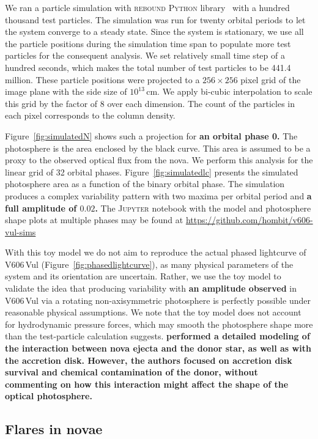 \documentclass[twocolumn]{aastex631}
\newcommand{\nova}{V606\,Vul}
\begin{document}
We ran a particle simulation with \textsc{rebound} \textsc{Python} library~\citep{rein_liu2012} with a hundred thousand test particles.
The simulation was run for twenty orbital periods to let the system converge to a steady state. 
Since the system is stationary, we use all the particle positions during the simulation time span to populate more test particles for the consequent analysis.
We set relatively small time step of a hundred seconds, which makes the total number of test particles to be 441.4 million.
These particle positions were projected to a $256\times256$ pixel grid of the image plane with the side size of $10^{13}$\,cm.
We apply bi-cubic interpolation to scale this grid by the factor of 8 over each dimension.
The count of the particles in each pixel corresponds to the column density.

Figure~\ref{fig:simulatedN} shows such a projection for {\bf an orbital phase 0.} 
The photosphere is the area enclosed by the black curve. 
This area is assumed to be a proxy to the observed optical flux from the nova. 
We perform this analysis for the linear grid of 32 orbital phases.
%
Figure~\ref{fig:simulatedlc} presents the simulated photosphere area 
as a function of the binary orbital phase.
The simulation produces a complex variability pattern
with two maxima per orbital period and {\bf a full amplitude of $0.02$.}
The \textsc{Jupyter} notebook with the model and photosphere shape plots at
multiple phases may be found at \url{https://github.com/hombit/v606-vul-sims} 

With this toy model we do not aim to reproduce the actual phased lightcurve of
\nova{} (Figure~\ref{fig:phasedlightcurve}), as many physical parameters of
the system and its orientation are uncertain. Rather, we use the toy model to
validate the idea that producing variability with {\bf an amplitude %
observed} in \nova{} via a rotating non-axisymmetric
photosphere is perfectly possible under reasonable physical assumptions.
We note that the toy model does not account for hydrodynamic pressure forces, 
which may smooth the photosphere shape more than the test-particle calculation suggests.
{\bf \cite{2018A&A...613A...8F} performed a detailed modeling of the interaction 
between nova ejecta and the donor star, as well as with the accretion disk. 
However, the authors focused on accretion disk survival and chemical contamination of the donor, 
without commenting on how this interaction might affect the shape of the optical photosphere.}


\subsection{Flares in novae}
\label{sec:flaringnovae}
\end{document}
